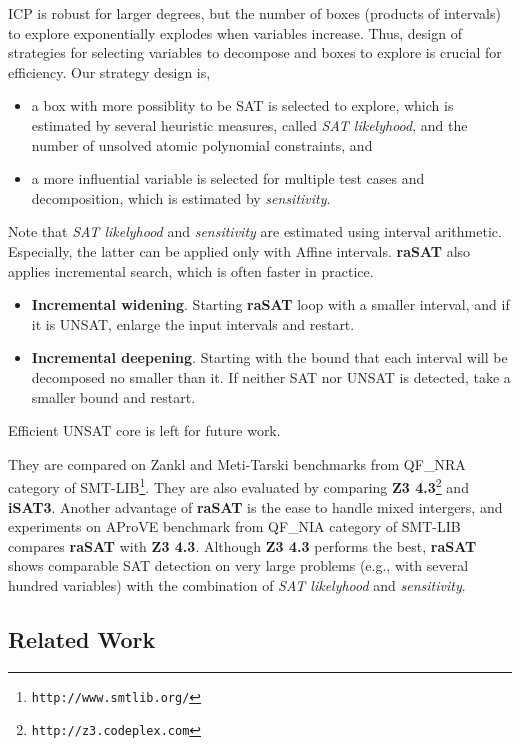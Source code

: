 \documentclass[runningheads,a4paper,oribibl]{llncs}
\begin{document}
ICP is robust for larger degrees, but the number of boxes (products of intervals) to explore 
exponentially explodes when variables increase. 
Thus, design of strategies for selecting variables to decompose and boxes to explore is crucial 
for efficiency. Our strategy design is, 
\begin{itemize}
\item a box with more possiblity to be SAT is selected to explore, which is estimated by 
several heuristic measures, called {\em SAT likelyhood}, 
and the number of unsolved atomic polynomial constraints, and
\item a more influential variable is selected for multiple test cases and decomposition, 
which is estimated by {\em sensitivity}. 
\end{itemize} 
Note that {\em SAT likelyhood} and {\em sensitivity} are estimated using interval arithmetic. 
Especially, the latter can be applied only with Affine intervals. 
{\bf raSAT} also applies incremental search, which is often faster in practice. 
\begin{itemize}
\item {\bf Incremental widening}. 
Starting {\bf raSAT} loop with a smaller interval, and if it is UNSAT, enlarge the input intervals
and restart. 
\item {\bf Incremental deepening}. 
Starting with the bound that each interval will be decomposed no smaller than it. 
If neither SAT nor UNSAT is detected, take a smaller bound and restart. 
\end{itemize} 
Efficient UNSAT core %
is left for future work. 

They are compared on Zankl and Meti-Tarski benchmarks from 
QF\_NRA category of SMT-LIB\footnote{\tt http://www.smtlib.org/}. 
They are also evaluated by comparing 
{\bf Z3 4.3}\footnote{\tt http://z3.codeplex.com} and {\bf iSAT3}. 
Another advantage of {\bf raSAT} is the ease to handle mixed intergers, 
and experiments on AProVE benchmark from QF\_NIA category of SMT-LIB compares {\bf raSAT} with 
{\bf Z3 4.3}. 
Although {\bf Z3 4.3} performs the best, {\bf raSAT} shows comparable SAT detection on 
very large problems (e.g., with several hundred variables) with the combination of 
{\em SAT likelyhood} and {\em sensitivity}. 


\subsection*{Related Work} \label{sec:relate}
\end{document}
